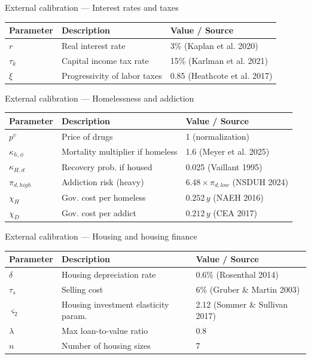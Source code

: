\documentclass[10pt,aspectratio=169]{beamer}
\begin{document}
\begin{frame}{External calibration --- Interest rates and taxes}
\small
\begin{table}
\centering
\begin{tabular}{lll}
\toprule
Parameter & Description & Value / Source\\
\midrule
$r$ & Real interest rate & 3\% (Kaplan et al. 2020)\\
$\tau_k$ & Capital income tax rate & 15\% (Karlman et al. 2021)\\
$\xi$ & Progressivity of labor taxes & 0.85 (Heathcote et al. 2017)\\
\bottomrule
\end{tabular}
\end{table}
\end{frame}

\begin{frame}{External calibration --- Homelessness and addiction}
\small
\begin{table}
\centering
\begin{tabular}{lll}
\toprule
Parameter & Description & Value / Source\\
\midrule
$p^v$ & Price of drugs & 1 (normalization)\\
$\kappa_{h,\phi}$ & Mortality multiplier if homeless & 1.6 (Meyer et al. 2025)\\
$\kappa_{H,d}$ & Recovery prob. if housed & 0.025 (Vaillant 1995)\\
$\pi_{d,high}$ & Addiction risk (heavy) & $6.48\times\pi_{d,low}$ (NSDUH 2024)\\
$\chi_H$ & Gov. cost per homeless & $0.252\,y$ (NAEH 2016)\\
$\chi_D$ & Gov. cost per addict & $0.212\,y$ (CEA 2017)\\
\bottomrule
\end{tabular}
\end{table}
\end{frame}

\begin{frame}{External calibration --- Housing and housing finance}
\small
\begin{table}
\centering
\begin{tabular}{lll}
\toprule
Parameter & Description & Value / Source\\
\midrule
$\delta$ & Housing depreciation rate & 0.6\% (Rosenthal 2014)\\
$\tau_s$ & Selling cost & 6\% (Gruber \& Martin 2003)\\
$\varsigma_2$ & Housing investment elasticity param. & 2.12 (Sommer \& Sullivan 2017)\\
$\lambda$ & Max loan-to-value ratio & 0.8\\
$n$ & Number of housing sizes & 7\\
\bottomrule
\end{tabular}
\end{table}
\end{frame}
\end{document}
